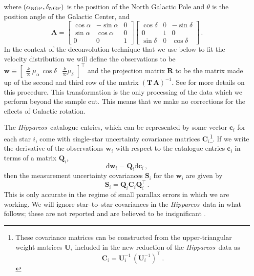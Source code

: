 \documentclass[12pt,preprint]{aastex}
\newcommand{\Hipparcos}{\textsl{Hipparcos}}
\renewcommand{\vec}[1]{\mathbf{#1}} %
\newcommand{\cc}{\vec{c}}
\newcommand{\ww}{\vec{w}}
\newcommand{\cci}{\cc_i}
\newcommand{\wwi}{\ww_i}
\newcommand{\ten}[1]{\mathbf{#1}} %
\newcommand{\CC}{\ten{C}}
\newcommand{\UU}{\ten{U}}
\newcommand{\QQ}{\ten{Q}}
\newcommand{\RR}{\ten{R}}
\renewcommand{\SS}{\ten{S}}
\newcommand{\TT}{\ten{T}}
\newcommand{\AAA}{\ten{A}}
\newcommand{\CCi}{\CC_i}
\newcommand{\UUi}{\UU_i}
\newcommand{\QQi}{\QQ_i}
\newcommand{\SSi}{\SS_i}
\newcommand{\T}{^{\scriptscriptstyle \top}}   %
\newcommand{\dd}{\mathrm{d}}
\newcommand{\ra}{\ensuremath{\alpha}}
\newcommand{\dec}{\ensuremath{\delta}}
\newcommand{\pmra}{\ensuremath{\mu_{\ra}}}
\newcommand{\pmdec}{\ensuremath{\mu_{\dec}}}
\newcommand{\parallax}{\ensuremath{\varpi}}
\newcommand{\ngp}{\textnormal{NGP}}
\newcommand{\rangp}{\ensuremath{\ra_\ngp}}
\newcommand{\decngp}{\ensuremath{\dec_\ngp}}
\newcommand{\matrixleft}{\left[}
\newcommand{\matrixright}{\right]}
\newcommand{\bhr}{BHR09}
\begin{document}
where $(\rangp,\decngp)$ is the position of the North Galactic Pole
and $\theta$ is the position angle of the Galactic Center, and
\begin{equation}
\AAA = \matrixleft \begin{array}{ccc} \cos \ra & -\sin \ra & 0 \\ \sin
\ra & \cos \ra & 0 \\ 0 & 0& 1 \end{array} \matrixright \matrixleft
\begin{array}{ccc} \cos \dec & 0 & -\sin \dec\\ 0 & 1 & 0 \\ \sin \dec
& 0 & \cos\dec\end{array} \matrixright\, .
\end{equation}
In the context of the deconvolution technique that we use below to fit
the velocity distribution we will define the observations to be $\ww
\equiv \matrixleft\begin{array}{cc}
\frac{k}{\parallax}\,\pmra\,\cos\dec&\frac{k}{\parallax}\pmdec\end{array}
\matrixright\T$ and the projection matrix $\RR$ to be the matrix made
up of the second and third row of the matrix $(\TT\,\AAA)^{-1}$. See
\citet[][hereafter \bhr]{Bovy09a} for more details on this
procedure. This transformation is the only processing of the data
which we perform beyond the sample cut. This means that we make no
corrections for the effects of Galactic rotation.

The \Hipparcos\ catalogue entries, which can be represented by some
vector $\cci$ for each star $i$, come with single-star uncertainty
covariance matrices $\CCi$\footnote{These covariance matrices can be
constructed from the upper-triangular weight matrices $\UUi$ included
in the new reduction of the \Hipparcos\ data as
\begin{equation}
\CCi= \UUi^{-1}\,\left(\UUi^{-1}\right)\T\, .
\end{equation}}. If we write
the derivative of the observations $\wwi$ with respect to the
catalogue entries $\cci$ in terms of a matrix $\QQi$,
\begin{equation}
\dd \wwi = \QQi \dd \cci\, ,
\end{equation}
then the measurement uncertainty covariances $\SSi$ for the $\wwi$ are
given by
\begin{equation}
\SSi=\QQi \CCi \QQi\T\, .
\end{equation}
This is only accurate in the regime of small parallax errors in which
we are working. We will ignore star--to--star covariances in the
\Hipparcos\ data in what follows; these are not reported and are
believed to be insignificant \citep[see \figurename~2.11
in][]{vanLeeuwen07a}.
\end{document}
